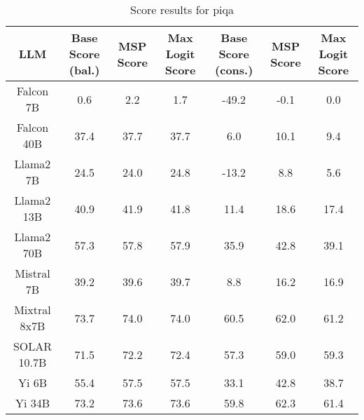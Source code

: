 \renewcommand\arraystretch{1.2}
\begin{table*}
\centering
\begin{tabular}{c|c|c|c|c|c|c}
LLM & Base Score (bal.) & MSP Score & Max Logit Score & Base Score (cons.) & MSP Score & Max Logit Score\\ \hline
Falcon 7B & 0.6 & 2.2 & 1.7 & -49.2 & -0.1 & 0.0\\
Falcon 40B & 37.4 & 37.7 & 37.7 & 6.0 & 10.1 & 9.4\\
Llama2 7B & 24.5 & 24.0 & 24.8 & -13.2 & 8.8 & 5.6\\
Llama2 13B & 40.9 & 41.9 & 41.8 & 11.4 & 18.6 & 17.4\\
Llama2 70B & 57.3 & 57.8 & 57.9 & 35.9 & 42.8 & 39.1\\
Mistral 7B & 39.2 & 39.6 & 39.7 & 8.8 & 16.2 & 16.9\\
Mixtral 8x7B & 73.7 & 74.0 & 74.0 & 60.5 & 62.0 & 61.2\\
SOLAR 10.7B & 71.5 & 72.2 & 72.4 & 57.3 & 59.0 & 59.3\\
Yi 6B & 55.4 & 57.5 & 57.5 & 33.1 & 42.8 & 38.7\\
Yi 34B & 73.2 & 73.6 & 73.6 & 59.8 & 62.3 & 61.4\\
\hline
\end{tabular}
\caption{Score results for piqa}
\end{table*}
\label{tab:piqa_score}
